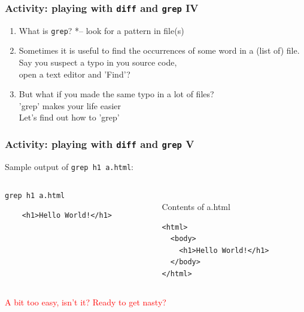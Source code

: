\begin{frame}
\frametitle{Activity: playing with \texttt{diff} and \texttt{grep} IV}
\begin{enumerate}
\item What is \texttt{grep}? *-- look for a pattern in file(s)
\item Sometimes it is useful to find the occurrences of some word in a (list of) file.\\ 
Say you suspect a typo in you source code,\\ 
open a text editor and 'Find'?
\item But what if you made the same typo in a lot of files?\\
'grep' makes your life easier\\
Let's find out how to 'grep'
\end{enumerate}
\end{frame}


\begin{frame}[fragile]
\frametitle{Activity: playing with \texttt{diff} and \texttt{grep} V}
Sample output of \texttt{grep h1 a.html}:

\begin{columns}
\begin{column}{0.5\textwidth}
\texttt{grep h1 a.html}

\begin{verbatim}
    <h1>Hello World!</h1>
\end{verbatim}
\end{column}

\begin{column}{0.5\textwidth}
\\Contents of a.html
\begin{verbatim}
<html>
  <body>
    <h1>Hello World!</h1>
  </body>
</html>
\end{verbatim}
\end{column}
\end{columns}

\pause
\textcolor{red}{A bit too easy, isn't it? Ready to get nasty?}
\end{frame}

